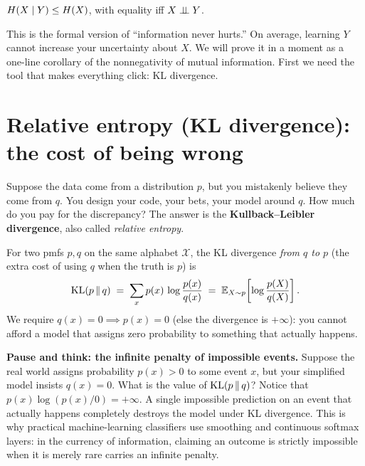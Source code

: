 \begin{theorem}
\label{ch33:cond-reduces}
$H(X \mid Y) \le H(X)$, with equality iff $X \perp\!\!\!\perp Y$.
\end{theorem}

This is the formal version of ``information never hurts.'' On average, learning $Y$ cannot increase your
uncertainty about $X$. We will prove it in a moment as a one-line corollary of the nonnegativity of
mutual information. First we need the tool that makes everything click: KL divergence.

\section{Relative entropy (KL divergence): the cost of being wrong}
\label{ch33:kl}

Suppose the data come from a distribution $p$, but you mistakenly believe they come from $q$. You design your code, your bets, your
model around $q$. How much do you pay for the discrepancy? The answer is the \textbf{Kullback--Leibler
divergence}, also called \emph{relative entropy}.

\begin{definition}[KL divergence]
\label{ch33:def-kl}
For two pmfs $p, q$ on the same alphabet $\mathcal{X}$, the KL divergence \emph{from $q$ to $p$} (the
extra cost of using $q$ when the truth is $p$) is
\[
  \operatorname{KL}(p \,\|\, q) \;=\; \sum_{x} p(x)\,\log\frac{p(x)}{q(x)}
                 \;=\; \operatorname{\mathbb{E}}_{X \sim p}\!\left[\log\frac{p(X)}{q(X)}\right].
\]
We require $q(x) = 0 \implies p(x) = 0$ (else the divergence is $+\infty$): you cannot afford a model that
assigns zero probability to something that actually happens.
\end{definition}

\begin{recoverybox}
\textbf{Pause and think: the infinite penalty of impossible events.}
Suppose the real world assigns probability $p(x) > 0$ to some event $x$, but your simplified model insists $q(x) = 0$. What is the value of $\operatorname{KL}(p \,\|\, q)$?
Notice that $p(x) \log(p(x) / 0) = +\infty$. A single impossible prediction on an event that actually happens completely destroys the model under KL divergence. This is why practical machine-learning classifiers use smoothing and continuous softmax layers: in the currency of information, claiming an outcome is strictly impossible when it is merely rare carries an infinite penalty.
\end{recoverybox}

